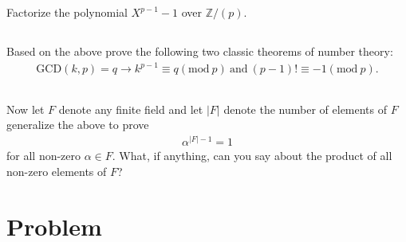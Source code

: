 \documentclass[10pt]{amsart}
\newcommand{\Z}{\mathbb{Z}}
\newcommand{\ra}{\rightarrow}
\renewcommand{\gcd}[2]{\text{GCD}\left(#1,#2\right)}
\renewcommand{\mod}[2]{#1\left(\text{mod}\ #2\right)}
\begin{document}
\subsection{}%
\label{sub:3c}

Factorize the polynomial $X^{p-1}-1$ over $\Z/(p)$.

\subsection{}%
\label{sub:3d}

Based on the above prove the following two classic theorems of number theory:
\begin{align*}
  \gcd{k}{p}=q\ra k^{p-1}\equiv \mod{q}{p}\ \text{and}\ (p-1)!\equiv
  \mod{-1}{p}.
\end{align*}

\subsection{}%
\label{sub:3e}

Now let $F$ denote any finite field and let $|F|$ denote the number of elements
of $F$ generalize the above to prove
\begin{align*}
  \alpha^{|F|-1}=1
\end{align*}
for all non-zero $\alpha\in F$. What, if anything, can you say about the
product of all non-zero elements of $F$?


\section{Problem}%
\label{sec:problem_4}
\end{document}

